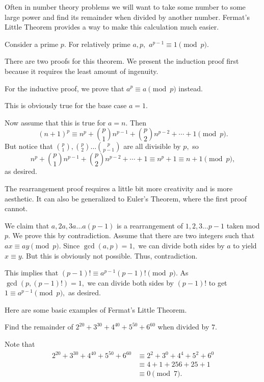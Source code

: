 \documentclass[blue,onecol]{shooting}
\begin{document}
Often in number theory problems we will want to take some number to some large power and find its remainder when divided by another number. Fermat's Little Theorem provides a way to make this calculation much easier.

\begin{theo}
Consider a prime $p.$ For relatively prime $a,p,$ $a^{p-1}\equiv 1\pmod {p}.$
\end{theo}

There are two proofs for this theorem. We present the induction proof first because it requires the least amount of ingenuity.
\begin{pro}[1 (Induction)]
For the inductive proof, we prove that $a^p\equiv a\pmod{p}$ instead.

This is obviously true for the base case $a=1.$

Now assume that this is true for $a=n.$ Then
\[(n+1)^p\equiv n^p+\binom{p}{1}n^{p-1}+\binom{p}{2}n^{p-2}+\cdots+1\pmod{p}.\]
But notice that $\binom{p}{1},\binom{p}{2}\dots\binom{p}{p-1}$ are all divisible by $p,$ so
\[n^p+\binom{p}{1}n^{p-1}+\binom{p}{2}n^{p-2}+\cdots+1\equiv n^p+1\equiv n+1 \pmod{p},\]
as desired.
\end{pro}
The rearrangement proof requires a little bit more creativity and is more aesthetic. It can also be generalized to Euler's Theorem, where the first proof cannot.
\begin{pro}[2 (Rearrangement)]
We claim that $a,2a,3a\dots a(p-1)$ is a rearrangement of $1,2,3\dots p-1$ taken mod $p.$ We prove this by contradiction. Assume that there are two integers such that $ax\equiv ay \pmod{p}.$ Since $\gcd(a,p)=1,$ we can divide both sides by $a$ to yield $x\equiv y.$ But this is obviously not possible. Thus, contradiction.

This implies that $(p-1)!\equiv a^{p-1}(p-1)! \pmod{p}.$ As $\gcd(p,(p-1)!)=1,$ we can divide both sides by $(p-1)!$ to get $1\equiv a^{p-1}\pmod{p},$ as desired.
\end{pro}

Here are some basic examples of Fermat's Little Theorem.

\begin{exam}
Find the remainder of $2^{20} + 3^{30} + 4^{40} + 5^{50} + 6^{60}$ when divided by $7.$
\end{exam}

\begin{sol}
Note that
\begin{align*}
2^{20} + 3^{30} + 4^{40} + 5^{50} + 6^{60}&\equiv 2^2+3^0+4^4+5^2+6^0\\
&\equiv 4+1+256+25+1 \\
&\equiv 0\pmod{7}.
\end{align*}
\end{sol}
\end{document}
